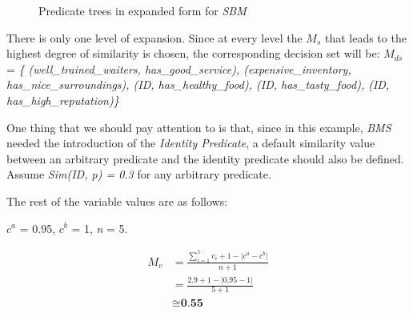 \begin{figure}[h!]
\begin{center}
\end{center}
\caption{Predicate trees in expanded form for \textit{SBM}}
\label{fig:res1}
\end{figure}

There is only one level of expansion. Since at every level the $M_{s}$ that leads to the highest degree of similarity is chosen, the corresponding decision set will be: $M_{ds}$ = \textit{\{ (well\_trained\_waiters, has\_good\_service), (expensive\_inventory, has\_nice\_surroundings), (ID, has\_healthy\_food), (ID, has\_tasty\_food), (ID, has\_high\_reputation)\}}

One thing that we should pay attention to is that, since in this example, \textit{BMS} needed the introduction of the \textit{Identity Predicate}, a default similarity value  between an arbitrary predicate and the identity predicate should also be defined. Assume \textit{Sim(ID, p) = 0.3} for any arbitrary predicate.  

The rest of the variable values are as follows:

$c^a$ = 0.95, $c^b$ = 1,   \textit{n} = 5.     

\begin{equation}\label{eq:sbmE2}
\begin{split}
M_v &=\frac{\sum_{i=1}^{5} v_i+1-\lvert c^a-c^b\rvert}{n+1}\\
&=\frac{2.9 +1-\lvert 0.95 - 1\rvert}{5+1}\\
&\cong{\textbf{0.55}}
 \end{split} 
\end{equation}

